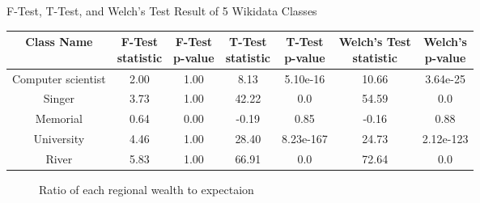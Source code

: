 \begin{center}
\small
\begin{threeparttable}
\caption{F-Test, T-Test, and Welch's Test Result of 5 Wikidata Classes}
\label{tab:western - mean test}
\begin{tabular}{c | c c c c c c} 
\toprule
    Class Name & \CellWithForceBreak{F-Test \\ statistic} & \CellWithForceBreak{F-Test \\ p-value} & \CellWithForceBreak{T-Test \\ statistic} & \CellWithForceBreak{T-Test \\ p-value} & \CellWithForceBreak{Welch's Test \\ statistic} & \CellWithForceBreak{Welch's \\ p-value} \\ [0.5ex] 
\midrule
    Computer scientist & 2.00 & 1.00 & 8.13 & 5.10e-16 & 10.66 & 3.64e-25 \\
    Singer & 3.73 & 1.00 & 42.22 & 0.0 & 54.59 & 0.0 \\
    Memorial & 0.64 & 0.00 & -0.19 & 0.85 & -0.16 & 0.88 \\
    University & 4.46 & 1.00 & 28.40 & 8.23e-167 & 24.73 & 2.12e-123 \\
    River & 5.83 & 1.00 & 66.91 & 0.0 & 72.64 & 0.0 \\
 [1ex]
\bottomrule
\end{tabular}
\begin{tablenotes}
    \footnotesize
    \item{}
\end{tablenotes}
\end{threeparttable}
\end{center}

\begin{figure}[htp]
\centering 
{}


\caption{Ratio of each regional wealth to expectaion}\label{fig:western - ratio of regional wealth to expectation}

\end{figure}